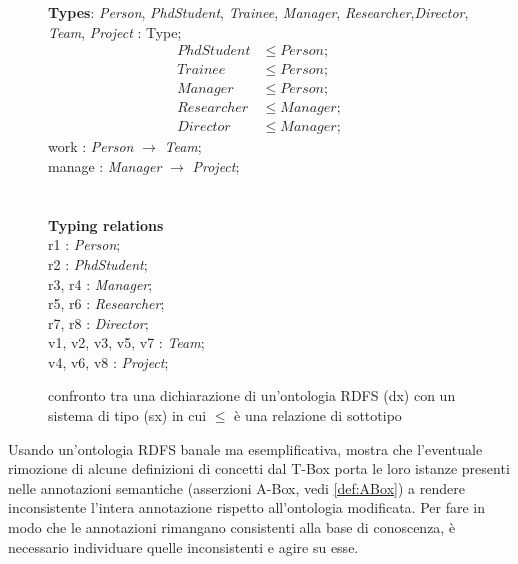 \begin{figure}
\begin{minipage}[t]{0.45\textwidth}
			\textbf{Types}: \textit{Person}, \textit{PhdStudent}, \textit{Trainee}, \textit{Manager}, \textit{Researcher},\textit{Director}, \textit{Team}, \textit{Project} : Type;
			\begin{align}
			PhdStudent &\le Person;\\
			Trainee &\le Person;\\
			Manager &\le Person;\\
			Researcher &\le Manager;\\
			Director &\le Manager;
		\end{align}
			work : \textit{Person} $\to$ \textit{Team};\\
			manage : \textit{Manager} $\to$ \textit{Project};\\\\\\
			\textbf{Typing relations}\\
			r1 : \textit{Person};\\
			r2 : \textit{PhdStudent};\\
			r3, r4 : \textit{Manager};\\
			r5, r6 : \textit{Researcher};\\
			r7, r8 : \textit{Director};\\
			v1, v2, v3, v5, v7 : \textit{Team};\\
			v4, v6, v8 : \textit{Project};\\
	\end{minipage}
	\captionsetup{justification=Centering}
	\caption{confronto tra una dichiarazione di un'ontologia RDFS (dx) con un sistema di tipo (sx) in cui $\le$ è una relazione di sottotipo}
	\label{fig:confrontotypesystem}
\end{figure}
\noindent
Usando un'ontologia RDFS banale ma esemplificativa, \cite{despeyroux2008evolution} mostra che l'eventuale rimozione di  alcune definizioni di concetti dal T-Box porta le loro istanze presenti nelle annotazioni semantiche (asserzioni A-Box, vedi \autoref{def:ABox}) a rendere inconsistente l'intera annotazione rispetto all'ontologia modificata. Per fare in modo che le annotazioni rimangano consistenti alla base di conoscenza, è necessario individuare quelle inconsistenti e agire su esse.
